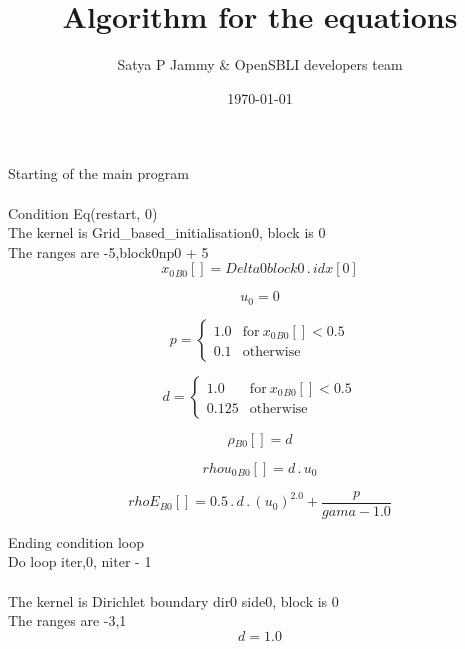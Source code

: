 \documentclass{article}
\title{Algorithm for the equations}
\author{Satya P Jammy \& OpenSBLI developers team}
\date{\today}
\begin{document}
\maketitle
\noindent Starting of the main program\\
\\\noindent Condition Eq(restart, 0)\\\noindent The kernel is Grid_based_initialisation0, block is 0\\\noindent The ranges are -5,block0np0 + 5\\\begin{dmath}{x_{0}{_{B0}}}[{}] = Delta0block0 \,.\, {idx}[{0}]\end{dmath}

\begin{dmath}u_{0} = 0\end{dmath}

\begin{dmath}p = \begin{cases} 1.0 & \text{for}\: {x_{0}{_{B0}}}[{}] < 0.5 \\0.1 & \text{otherwise} \end{cases}\end{dmath}

\begin{dmath}d = \begin{cases} 1.0 & \text{for}\: {x_{0}{_{B0}}}[{}] < 0.5 \\0.125 & \text{otherwise} \end{cases}\end{dmath}

\begin{dmath}{\rho{_{B0}}}[{}] = d\end{dmath}

\begin{dmath}{rhou_{0}{_{B0}}}[{}] = d \,.\, u_{0}\end{dmath}

\begin{dmath}{rhoE{_{B0}}}[{}] = 0.5 \,.\, d \,.\, \left(u_{0} \right)^{2.0} + \frac{p}{gama - 1.0}\end{dmath}

\noindent Ending condition loop %
\\\noindent Do loop iter,0, niter - 1\\
\\\noindent The kernel is Dirichlet boundary dir0 side0, block is 0\\\noindent The ranges are -3,1\\\begin{dmath}d = 1.0\end{dmath}
\end{document}
